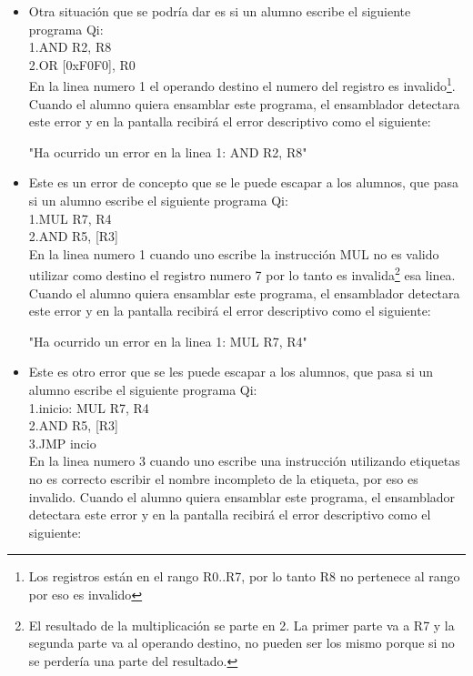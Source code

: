 \begin{itemize}
\item Otra situación que se podría dar es si un alumno escribe el siguiente programa Qi:\\

1.AND R2, R8 \\
2.OR [0xF0F0], R0 \\

En la linea numero 1 el operando destino el numero del registro es invalido\footnote{Los registros están en el rango R0..R7, por lo tanto R8 no pertenece al rango por eso es invalido}. Cuando el alumno quiera ensamblar este programa, el ensamblador detectara este error y en la pantalla recibirá el error descriptivo como el siguiente:

"Ha ocurrido un error en la linea 1: AND R2, R8" \\ 

\item Este es un error de concepto que se le puede escapar a los alumnos, que pasa si un alumno escribe el siguiente programa Qi:\\

1.MUL R7, R4 \\
2.AND R5, [R3] \\

En la linea numero 1 cuando uno escribe la instrucción MUL no es valido utilizar como destino el registro numero 7 por lo tanto es invalida\footnote{El resultado de la multiplicación se parte en 2. La primer parte va a R7 y la segunda parte va al operando destino, no pueden ser los mismo porque si no se perdería una parte del resultado.} esa linea. Cuando el alumno quiera ensamblar este programa, el ensamblador detectara este error y en la pantalla recibirá el error descriptivo como el siguiente:

"Ha ocurrido un error en la linea 1: MUL R7, R4" \\ 

\item Este es otro error que se les puede escapar a los alumnos, que pasa si un alumno escribe el siguiente programa Qi:\\

1.inicio: MUL R7, R4 \\
2.AND R5, [R3] \\
3.JMP incio \\

En la linea numero 3 cuando uno escribe una instrucción utilizando etiquetas no es correcto escribir el nombre incompleto de la etiqueta, por eso es invalido. Cuando el alumno quiera ensamblar este programa, el ensamblador detectara este error y en la pantalla recibirá el error descriptivo como el siguiente:


\end{itemize}
